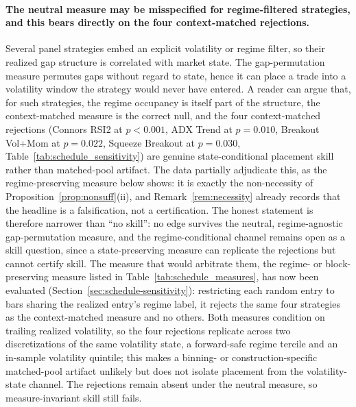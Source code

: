 \documentclass[preprint,12pt]{elsarticle}
\theoremstyle{definition}
\begin{document}
\paragraph{The neutral measure may be misspecified for regime-filtered strategies, and
this bears directly on the four context-matched rejections.} Several panel strategies
embed an explicit volatility or regime filter, so their realized gap structure is
correlated with market state. The gap-permutation measure permutes gaps without regard
to state, hence it can place a trade into a volatility window the strategy would never
have entered. A reader can argue that, for such strategies, the regime occupancy is
itself part of the structure, the context-matched measure is the correct null, and the
four context-matched rejections (Connors RSI2 at $p<0.001$, ADX Trend at $p=0.010$,
Breakout Vol+Mom at $p=0.022$, Squeeze Breakout at $p=0.030$,
Table~\ref{tab:schedule_sensitivity}) are genuine state-conditional placement skill
rather than matched-pool artifact. The data partially adjudicate this, as the regime-preserving measure below shows: it is
exactly the non-necessity of Proposition~\ref{prop:nonsuff}(ii), and
Remark~\ref{rem:necessity} already records that the headline is a falsification, not a
certification. The honest statement is therefore narrower than ``no skill'': no edge
survives the neutral, regime-agnostic gap-permutation measure, and the
regime-conditional channel remains open as a skill question, since a state-preserving measure can replicate the rejections but cannot certify skill. The measure that would arbitrate them, the regime-
or block-preserving measure listed in Table~\ref{tab:schedule_measures}, has now been
evaluated (Section~\ref{sec:schedule-sensitivity}): restricting each random entry to
bars sharing the realized entry's regime label, it rejects the same four strategies as
the context-matched measure and no others. Both measures condition on trailing realized volatility, so the four rejections replicate
across two discretizations of the same volatility state, a forward-safe regime tercile and an
in-sample volatility quintile; this makes a binning- or construction-specific matched-pool
artifact unlikely but does not isolate placement from the volatility-state channel. The
rejections remain absent under the neutral measure, so measure-invariant skill still fails.
\end{document}
